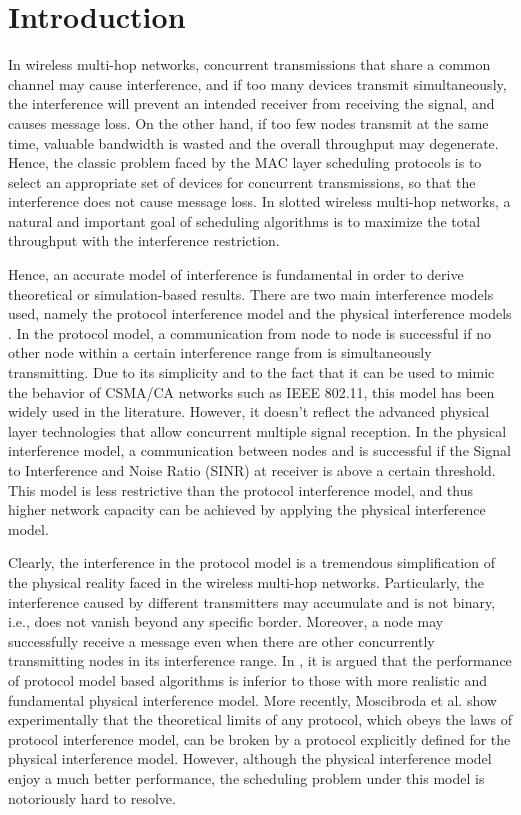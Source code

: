 \documentclass[conference]{IEEEtran}
\begin{document}
\IEEEpeerreviewmaketitle



\section{Introduction}\label{section1}
In wireless multi-hop networks, concurrent transmissions that share
a common channel may cause interference, and if too many devices
transmit simultaneously, the interference will prevent an intended
receiver from receiving the signal, and causes message loss. On the
other hand, if too few nodes transmit at the same time, valuable
bandwidth is wasted and the overall throughput may degenerate.
Hence, the classic problem faced by the MAC layer scheduling
protocols is to select an appropriate set of devices for concurrent
transmissions, so that the interference does not cause message loss.
In slotted wireless multi-hop networks, a natural and important goal
of scheduling algorithms is to maximize the total throughput with
the interference restriction.

Hence, an accurate model of interference is fundamental in order to
derive theoretical or simulation-based results. There are two main
interference models used, namely the protocol interference model and
the physical interference models \cite{gupta2000cwn}. In the
protocol model, a communication from node  to node  is
successful if no other node within a certain interference range from
 is simultaneously transmitting. Due to its simplicity and to the
fact that it can be used to mimic the behavior of CSMA/CA networks
such as IEEE 802.11, this model has been widely used in the
literature. However, it doesn't reflect the advanced physical layer
technologies that allow concurrent multiple signal reception. In the
physical interference model, a communication between nodes  and
 is successful if the Signal to Interference and Noise Ratio
(SINR) at receiver  is above a certain threshold. This model is
less restrictive than the protocol interference model, and thus
higher network capacity can be achieved by applying the physical
interference model.

Clearly, the interference in the protocol model is a tremendous
simplification of the physical reality faced in the wireless
multi-hop networks. Particularly, the interference caused by
different transmitters may accumulate and is not binary, i.e., does
not vanish beyond any specific border. Moreover, a node may
successfully receive a message even when there are other
concurrently transmitting nodes in its interference range. In
\cite{behzad2003pgb,gronkvist2001cbg}, it is argued that the
performance of protocol model based algorithms is inferior to those
with more realistic and fundamental physical interference model.
More recently, Moscibroda et al. \cite{moscibroda2006pdb} show
experimentally that the theoretical limits of any protocol, which
obeys the laws of protocol interference model, can be broken by a
protocol explicitly defined for the physical interference model.
However, although the physical interference model enjoy a much
better performance, the scheduling problem under this model is
notoriously hard to resolve.
\end{document}
